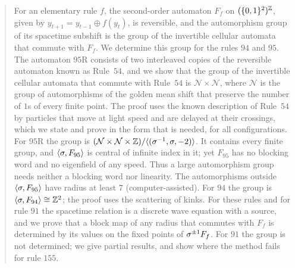 \begin{abstract}
For an elementary rule $f$, the second-order automaton $F_f$ on $(\{0,1\}^2)^{\Z}$, given by $y_{t+1}=y_{t-1}\oplus f(y_t)$, is reversible, and the automorphism group of its spacetime subshift is the group of the invertible cellular automata that commute with $F_f$. We determine this group for the rules $94$ and $95$. The automaton $95$R consists of two interleaved copies of the reversible automaton known as Rule~$54$, and we show that the group of the invertible cellular automata that commute with Rule~$54$ is $\mathcal N\times\mathcal N$, where $\mathcal N$ is the group of automorphisms of the golden mean shift that preserve the number of $1$s of every finite point. The proof uses the known description of Rule~$54$ by particles that move at light speed and are delayed at their crossings, which we state and prove in the form that is needed, for all configurations. For $95$R the group is $(\mathcal N\times\mathcal N\times\Z)/\langle(\sh^{-1},\sh,-2)\rangle$. It contains every finite group, and $\langle\sh,F_{95}\rangle$ is central of infinite index in it; yet $F_{95}$ has no blocking word and no eigenfield of any speed. Thus a large automorphism group needs neither a blocking word nor linearity. The automorphisms outside $\langle\sh,F_{95}\rangle$ have radius at least $7$ (computer-assisted). For $94$ the group is $\langle\sh,F_{94}\rangle\cong\Z^2$; the proof uses the scattering of kinks. For these rules and for rule $91$ the spacetime relation is a discrete wave equation with a source, and we prove that a block map of any radius that commutes with $F_f$ is determined by its values on the fixed points of $\sh^{\pm1}F_f$. For $91$ the group is not determined; we give partial results, and show where the method fails for rule $155$.
\end{abstract}
